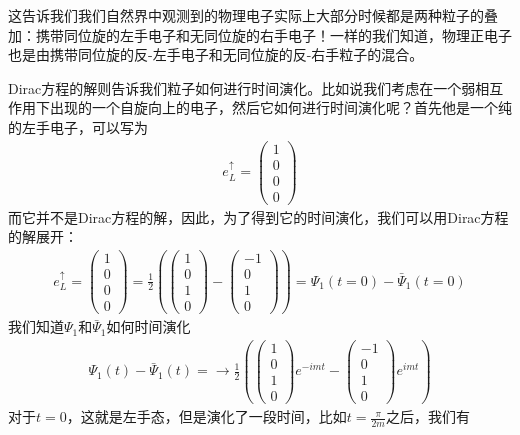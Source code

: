 这告诉我们我们自然界中观测到的物理电子实际上大部分时候都是两种粒子的叠加：携带同位旋的左手电子和无同位旋的右手电子！一样的我们知道，物理正电子也是由携带同位旋的反-左手电子和无同位旋的反-右手粒子的混合。

Dirac方程的解则告诉我们粒子如何进行时间演化。比如说我们考虑在一个弱相互作用下出现的一个自旋向上的电子，然后它如何进行时间演化呢？首先他是一个纯的左手电子，可以写为
\begin{align}
e_L^\uparrow=\left(\begin{matrix}1\\0\\0\\0\end{matrix}\right)
\end{align}
而它并不是Dirac方程的解，因此，为了得到它的时间演化，我们可以用Dirac方程的解展开：
\begin{align}
e_L^\uparrow=\left(\begin{matrix}1\\0\\0\\0\end{matrix}\right)=\frac{1}{2}\left(\left(\begin{matrix}1\\0\\1\\0\end{matrix}\right)-\left(\begin{matrix}-1\\0\\1\\0\end{matrix}\right)\right)=\Psi_1(t=0)-\bar{\Psi}_1(t=0)
\end{align}
我们知道$\Psi_1$和$\bar{\Psi}_1$如何时间演化
\begin{align}
\Psi_1(t)-\bar{\Psi}_1(t)=\to\frac{1}{2}\left(\left(\begin{matrix}1\\0\\1\\0\end{matrix}\right)e^{-imt}-\left(\begin{matrix}-1\\0\\1\\0\end{matrix}\right)e^{imt}\right)
\end{align}
对于$t=0$，这就是左手态，但是演化了一段时间，比如$t=\frac{\pi}{2m}$之后，我们有
